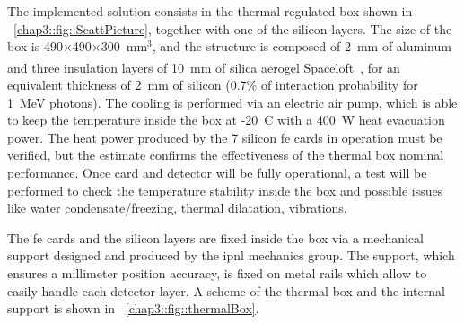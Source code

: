 The implemented solution consists in the thermal regulated box shown in \figurename~\ref{chap3::fig::ScattPicture}, together with one of the silicon layers. The size of the box is 490$\times$490$\times$300~mm$^3$, and the structure is composed of 2~mm of aluminum and three insulation layers of 10~mm of silica aerogel Spaceloft\textsuperscript{\textregistered}~\parencite{Spaceloft2011}, for an equivalent thickness of 2~mm of silicon (0.7\% of interaction probability for 1~MeV photons). The cooling is performed via an electric air pump, which is able to keep the temperature inside the box at -20~\textdegree{}C with a 400~W heat evacuation power. The heat power produced by the 7 silicon \gls{fe} cards in operation must be verified, but the estimate confirms the effectiveness of the thermal box nominal performance. Once card and detector will be fully operational, a test will be performed to check the temperature stability inside the box and possible issues like water condensate/freezing, thermal dilatation, vibrations.

The 	\gls{fe} cards and the silicon layers are fixed inside the box via a mechanical support designed and produced by the \gls{ipnl} mechanics group. The support, which ensures a millimeter position accuracy, is fixed on metal rails which allow to easily handle each detector layer. A scheme of the thermal box and the internal support is shown in \figurename~\ref{chap3::fig::thermalBox}.
    

